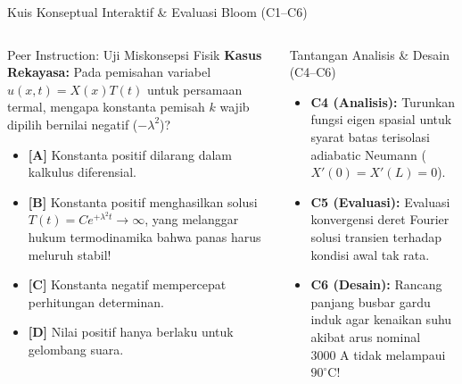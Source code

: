 \documentclass[aspectratio=169,10pt]{beamer}
\begin{document}
\begin{frame}{Kuis Konseptual Interaktif \& Evaluasi Bloom (C1--C6)}
  \begin{columns}[t]
    \begin{alertblock}{Peer Instruction: Uji Miskonsepsi Fisik}
      \footnotesize
      \textbf{Kasus Rekayasa:} Pada pemisahan variabel $u(x,t) = X(x)T(t)$ untuk persamaan termal, mengapa konstanta pemisah $k$ wajib dipilih bernilai negatif ($-\lambda^2$)?
      \vspace{0.05cm}
      \begin{itemize}\setlength{\itemsep}{1pt}
        \item \textbf{[A]} Konstanta positif dilarang dalam kalkulus diferensial.
        \item \textbf{[B]} Konstanta positif menghasilkan solusi $T(t) = C e^{+\lambda^2 t} \to \infty$, yang melanggar hukum termodinamika bahwa panas harus meluruh stabil!
        \item \textbf{[C]} Konstanta negatif mempercepat perhitungan determinan.
        \item \textbf{[D]} Nilai positif hanya berlaku untuk gelombang suara.
      \end{itemize}
    \end{alertblock}

    \begin{block}{Tantangan Analisis \& Desain (C4--C6)}
      \footnotesize
      \begin{itemize}\setlength{\itemsep}{2pt}
        \item \textbf{C4 (Analisis):} Turunkan fungsi eigen spasial untuk syarat batas terisolasi adiabatic Neumann ($X'(0)=X'(L)=0$).
        \item \textbf{C5 (Evaluasi):} Evaluasi konvergensi deret Fourier solusi transien terhadap kondisi awal tak rata.
        \item \textbf{C6 (Desain):} Rancang panjang busbar gardu induk agar kenaikan suhu akibat arus nominal $3000\text{ A}$ tidak melampaui $90^\circ\text{C}$!
      \end{itemize}
    \end{block}
  \end{columns}
\end{frame}
\end{document}
